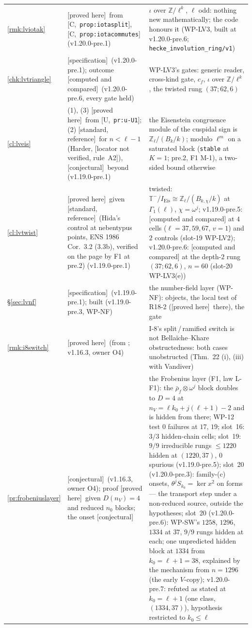 \documentclass[11pt]{article}
\theoremstyle{remark}
\newcommand{\Z}{\mathbb{Z}}
\newcommand{\Ga}{\Gamma}
\newcommand{\T}{\mathbb{T}}
\newcommand{\HA}[1]{[C,~\texttt{#1}]}      %
\newcommand{\PROVED}{\textsf{[proved here]}}
\newcommand{\STD}{\textsf{[standard, reference]}}
\newcommand{\CONJ}{\textsf{[conjectural]}}
\newcommand{\CMPD}{\textsf{[computed and compared]}}   %
\newcommand{\SPEC}{\textsf{[specification]}}           %
\newcommand{\VERIFYloc}{\textsf{[locator not verified, rule~A2]}} %
\newcommand{\Ucite}[1]{[U,~\texttt{#1}]}               %
\begin{document}
\begin{center}
\begin{longtable}{@{}l>{\raggedright\arraybackslash}p{3.6cm}>{\raggedright\arraybackslash}p{10.6cm}@{}}
\ref{rmk:lviotak} & \PROVED\ from \HA{prop:iotasplit}, \HA{prop:iotacommutes} (v1.20.0-pre.1) & $\iota$ over $\Z/\ell^{k}$, $\ell$ odd: nothing new mathematically; the code honours it (WP-LV3, built at v1.20.0-pre.6; \texttt{hecke\_involution\_ring/v1}) \\
\ref{chk:lvtriangle} & \SPEC\ (v1.20.0-pre.1); outcome \CMPD\ (v1.20.0-pre.6, every gate held) & WP-LV3's gates: generic reader, cross-kind gate, $c_f$, $\iota$ over $\Z/\ell^{k}$, the twisted rung $(37;62,6)$ \\
\ref{cl:lveis} & (1), (3) \PROVED\ from \Ucite{pr:u-U1}; (2) \STD\ for $n<\ell-1$ (Harder, \VERIFYloc), \CONJ\ beyond (v1.19.0-pre.1) & the Eisenstein congruence module of the cuspidal sign is $\Z_\ell/(B_k/k)$; modulo $\ell^{m}$ on a saturated block (\texttt{stable} at $K=1$; pre.2, F1 M-1), a two-sided bound otherwise \\
\ref{cl:lvtwist} & \PROVED\ given \STD\ (Hida's control at nebentypus points, ENS 1986 Cor.~3.2 (3.3b), verified on the page by F1 at pre.2) (v1.19.0-pre.1) & twisted: $\T^{-}/I_{\mathrm{Eis}}\cong\Z_\ell/(B_{k,\chi}/k)$ at $\Ga_1(\ell)$, $\chi=\omega^{j}$; v1.19.0-pre.5: \CMPD{} at $4$ cells ($\ell=37,59,67$, $v=1$) and $2$ controls (slot-19 WP-LV2); v1.20.0-pre.6: \CMPD{} at the depth-$2$ rung $(37;62,6)$, $n=60$ (slot-20 WP-LV3(e)) \\
\S\ref{sec:lvnf} & \SPEC\ (v1.19.0-pre.1); built (v1.19.0-pre.3, WP-NF) & the number-field layer (WP-NF): objects, the local test of R18-2 (\PROVED\ there), the gate \\
\ref{rmk:i8switch} & \PROVED\ (from \cite{bk}; v1.16.3, owner O4) & I-8's split\,/\,ramified switch is not Bella\"iche--Khare obstructedness: both cases unobstructed (Thm.~22 (i), (iii) with Vandiver) \\
\ref{pr:frobeniuslayer} & \CONJ\ (v1.16.3, owner O4); proof \PROVED\ given $D(n_V)=4$ and reduced $n_0$ blocks; the onset \CONJ & the Frobenius layer (F1, law L-F1): the $\bar\rho_f\otimes\omega^j$ block doubles to $D=4$ at $n_V=\ell k_0+j(\ell+1)-2$ and is hidden from there; WP-12 test $0$ failures at $17$, $19$; slot~16: $3/3$ hidden-chain cells; slot~19: $9/9$ irreducible rungs $\le1220$ hidden at $(1220,37)$, $0$ spurious (v1.19.0-pre.5); slot~20 (v1.20.0-pre.3): family-(c) onsets, $\theta^{j}S_{k_0}=\ker x^{2}$ on forms --- the transport step under a non-reduced source, outside the hypotheses; slot~20 (v1.20.0-pre.6): WP-SW's $1258$, $1296$, $1334$ at $37$, $9/9$ rungs hidden at each; one unpredicted hidden block at $1334$ from $k_0=\ell+1=38$, explained by the mechanism from $n=1296$ (the early $V$-copy); v1.20.0-pre.7: refuted as stated at $k_0=\ell+1$ (one class, $(1334,37)$), hypothesis restricted to $k_0\le\ell$ \\

\end{longtable}
\end{center}
\end{document}
